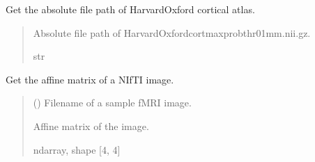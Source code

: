 \documentclass[letterpaper,10pt,english]{sphinxhowto}
\begin{document}

\begin{fulllineitems}
\label{\detokenize{stuff:neurora.stuff.get_HOcort}}
\pysigstartsignatures
{}
\pysigstopsignatures
\sphinxAtStartPar
Get the absolute file path of HarvardOxford cortical atlas.
\begin{quote}\begin{description}
\sphinxAtStartPar
{} \textendash{} Absolute file path of HarvardOxford\sphinxhyphen{}cort\sphinxhyphen{}maxprob\sphinxhyphen{}thr0\sphinxhyphen{}1mm.nii.gz.

\sphinxAtStartPar
str

\end{description}\end{quote}

\end{fulllineitems}


\begin{fulllineitems}
\label{\detokenize{stuff:neurora.stuff.get_affine}}
\pysigstartsignatures
{}
\pysigstopsignatures
\sphinxAtStartPar
Get the affine matrix of a NIfTI image.
\begin{quote}\begin{description}
\sphinxAtStartPar
{} () \textendash{} Filename of a sample fMRI image.

\sphinxAtStartPar
{} \textendash{} Affine matrix of the image.

\sphinxAtStartPar
ndarray, shape {[}4, 4{]}

\end{description}\end{quote}

\end{fulllineitems}
\end{document}

